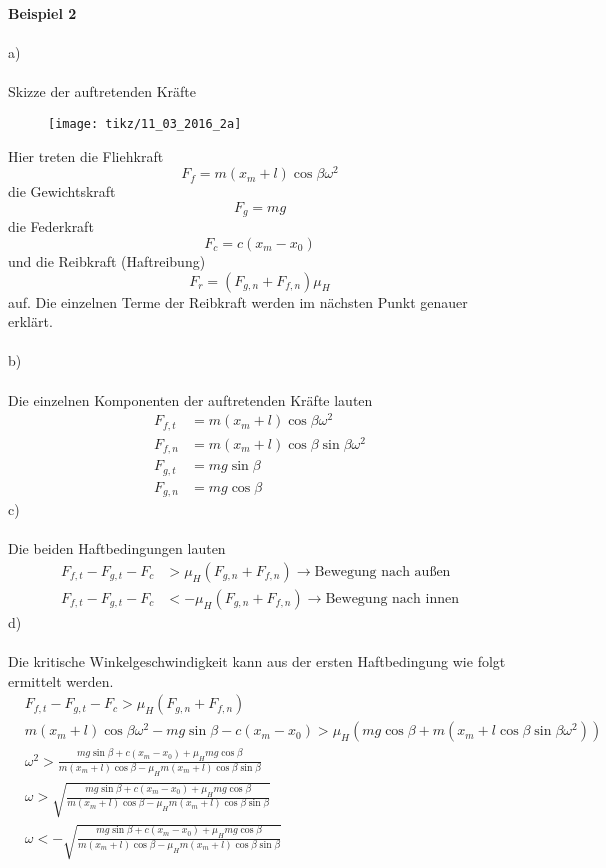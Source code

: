 \newpage
\noindent
\textbf{Beispiel 2} \\ \\
a) \\ \\
Skizze der auftretenden Kräfte
\begin{figure}[h]
	\centering
	\texttt{[image: tikz/11\_03\_2016\_2a]}
\end{figure}
\newline
Hier treten die Fliehkraft
\[
	F_f = m(x_m + l)\cos\beta\omega^2
\]
die Gewichtskraft
\[	
	F_g = mg
\]
die Federkraft
\[
	F_c = c (x_m - x_0)
\]
und die Reibkraft (Haftreibung) 
\[
	F_r = (F_{g,n} + F_{f,n})\mu_H
\]
auf. Die einzelnen Terme der Reibkraft werden im nächsten Punkt genauer erklärt.\\ \\
b) \\ \\
Die einzelnen Komponenten der auftretenden Kräfte lauten
\begin{align*}
	F_{f,t} &= m(x_m + l)\cos\beta\omega^2 \\
	F_{f,n} &= m(x_m + l)\cos\beta\sin\beta\omega^2 \\
	F_{g,t} &= mg\sin\beta \\
	F_{g,n} &= mg\cos\beta
\end{align*}
c)\\ \\
Die beiden Haftbedingungen lauten
\begin{align*}
	F_{f,t} - F_{g,t} - F_c &> \mu_H (F_{g,n} + F_{f,n}) \rightarrow \text{Bewegung nach außen} \\
	F_{f,t} - F_{g,t} - F_c &< -\mu_H (F_{g,n} + F_{f,n}) \rightarrow \text{Bewegung nach innen}
\end{align*}
\newpage
\noindent
d) \\ \\ 
Die kritische Winkelgeschwindigkeit kann aus der ersten Haftbedingung wie folgt ermittelt werden.
\begin{align*}
	&F_{f,t} - F_{g,t} - F_c > \mu_H (F_{g,n} + F_{f,n}) \\
	&m(x_m + l)\cos\beta\omega^2 - mg\sin\beta - c(x_m - x_0) > \mu_H (mg\cos\beta + m(x_m + l\cos\beta\sin\beta\omega^2)) \\
	& \omega^2 > \frac{mg\sin\beta + c(x_m - x_0) + \mu_Hmg\cos\beta}{m(x_m + l)\cos\beta - \mu_Hm(x_m + l)\cos\beta\sin\beta} \\
	&\omega > \sqrt{\frac{mg\sin\beta + c(x_m - x_0) + \mu_Hmg\cos\beta}{m(x_m + l)\cos\beta - \mu_Hm(x_m + l)\cos\beta\sin\beta}} \\
	&\omega < - \sqrt{\frac{mg\sin\beta + c(x_m - x_0) + \mu_Hmg\cos\beta}{m(x_m + l)\cos\beta - \mu_Hm(x_m + l)\cos\beta\sin\beta}}
\end{align*} 